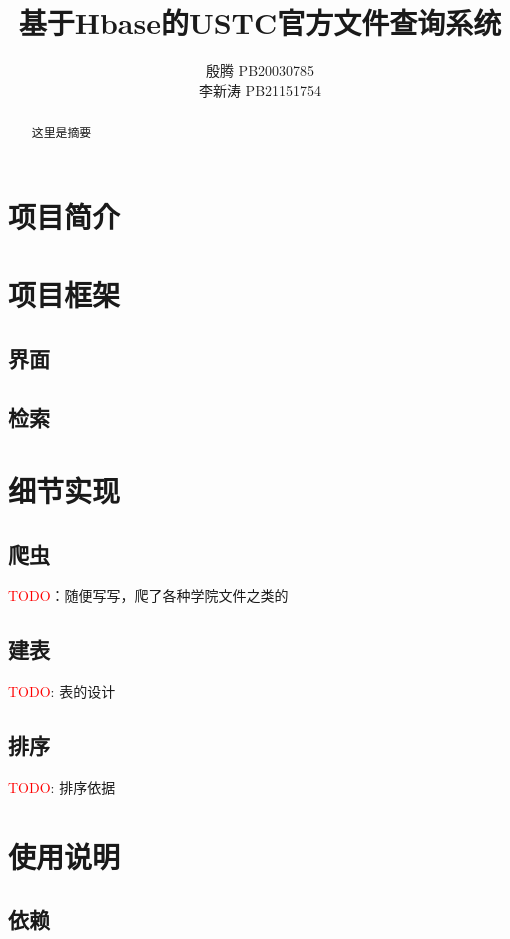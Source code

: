 \documentclass{article}
\title{\bfseries 基于Hbase的USTC官方文件查询系统}
\author{殷腾 \quad PB20030785\\
	李新涛 \quad PB21151754}
\begin{document}
	\maketitle
	\begin{abstract}
		这里是摘要
	\end{abstract}

	\tableofcontents
	\clearpage
	
	
	\section{项目简介}
	
	\section{项目框架}
	\subsection{界面}
	
	\subsection{检索}
	
	\section{细节实现}
	\subsection{爬虫}
	\textcolor{red}{TODO}：随便写写，爬了各种学院文件之类的
	\subsection{建表}
	\textcolor{red}{TODO}: 表的设计
	\subsection{排序}
	\textcolor{red}{TODO}: 排序依据
	
	\section{使用说明}
	\subsection{依赖}
	
\end{document}
